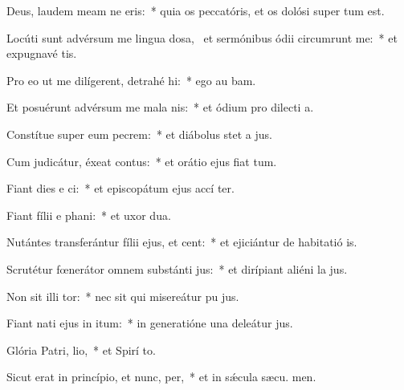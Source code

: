 \item Deus, laudem meam ne eris:~* quia os peccatóris, et os dolósi super  tum est.
\item Locúti sunt advérsum me lingua dosa,~\pscross{} et sermónibus ódii circumrunt me:~* et expugnavé  tis.
\item Pro eo ut me dilígerent, detrahé hi:~* ego au bam.
\item Et posuérunt advérsum me mala  nis:~* et ódium pro dilecti a.
\item Constítue super eum pecrem:~* et diábolus stet a  jus.
\item Cum judicátur, éxeat contus:~* et orátio ejus fiat  tum.
\item Fiant dies e ci:~* et episcopátum ejus accí ter.
\item Fiant fílii e phani:~* et uxor  dua.
\item Nutántes transferántur fílii ejus, et cent:~* et ejiciántur de habitatió is.
\item Scrutétur fœnerátor omnem substánti jus:~* et dirípiant aliéni la jus.
\item Non sit illi tor:~* nec sit qui misereátur pu jus.
\item Fiant nati ejus in itum:~* in generatióne una deleátur  jus.
\item Glória Patri,  lio,~* et Spirí to.
\item Sicut erat in princípio, et nunc,  per,~* et in sǽcula sæcu. men.
